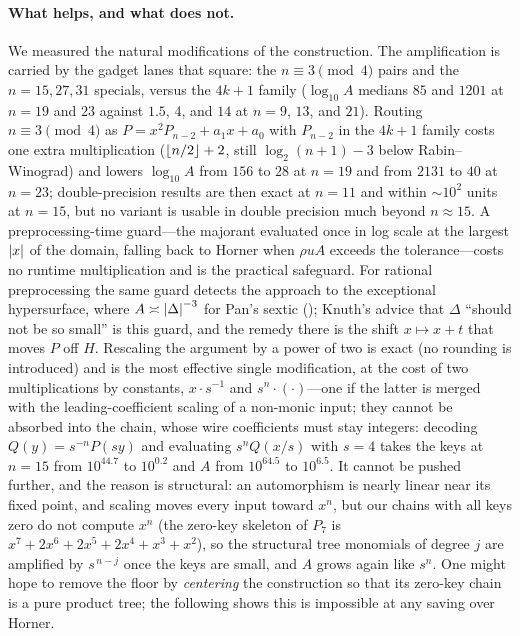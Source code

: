 \paragraph{What helps, and what does not.}
We measured the natural modifications of the construction.  The amplification
is carried by the gadget lanes that square: the $n\equiv3\pmod 4$ pairs and
the $n=15,27,31$ specials, versus the $4k+1$ family
($\log_{10}A$ medians $85$ and $1201$ at $n=19$ and $23$ against $1.5$, $4$,
and $14$ at $n=9$, $13$, and $21$).  Routing $n\equiv3\pmod4$ as
$P=x^2P_{n-2}+a_1x+a_0$ with $P_{n-2}$ in the $4k+1$ family costs one extra
multiplication ($\left\lfloor {n/2} \right\rfloor+2$, still $\log_2(n+1)-3$ below Rabin--Winograd)
and lowers $\log_{10}A$ from $156$ to $28$ at $n=19$ and from $2131$ to $40$
at $n=23$; double-precision results are then exact at $n=11$ and within
$\sim10^2$ units at $n=15$, but no variant is usable in double precision much
beyond $n\approx15$.  A preprocessing-time guard---the majorant evaluated once
in log scale at the largest $\left\lvert x\right\rvert$ of the domain, falling back to Horner
when $\rho uA$ exceeds the tolerance---costs no runtime multiplication and is
the practical safeguard.  For rational preprocessing the same guard detects
the approach to the exceptional hypersurface, where $A\asymp\left\lvert \Delta\right\rvert^{-3}$
for Pan's sextic (); Knuth's advice that
$\Delta$ ``should not be so small'' is this guard, and the remedy there is
the shift $x\mapsto x+t$ that moves $P$ off $H$.  Rescaling the argument by a power of two is exact (no rounding is
introduced) and is the most effective single modification, at the cost of two
multiplications by constants, $x\cdot s^{-1}$ and $s^n\cdot(\cdot)$---one if
the latter is merged with the leading-coefficient scaling of a non-monic
input; they cannot be absorbed into the chain, whose wire coefficients must
stay integers: decoding $Q(y)=s^{-n}P(sy)$ and evaluating $s^nQ(x/s)$ with
$s=4$ takes the keys at $n=15$ from $10^{44.7}$ to $10^{0.2}$ and $A$ from
$10^{64.5}$ to $10^{6.5}$.  It cannot be pushed
further, and the reason is structural: an automorphism is nearly linear near
its fixed point, and scaling moves every input toward $x^n$, but our chains
with all keys zero do not compute $x^n$ (the zero-key skeleton of $P_7$ is
$x^7+2x^6+2x^5+2x^4+x^3+x^2$), so the structural tree monomials of degree $j$
are amplified by $s^{\,n-j}$ once the keys are small, and $A$ grows again
like $s^n$.  One might hope to remove the floor by \emph{centering} the
construction so that its zero-key chain is a pure product tree; the following
shows this is impossible at any saving over Horner.


